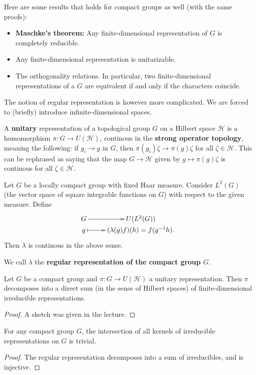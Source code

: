 \documentclass[11pt, english]{article}
\begin{document}
Here are some results that holds for compact groups as well (with the same proofs):
\begin{itemize}
\item \textbf{Maschke's theorem:} Any finite-dimensional representation of $G$ is completely reducible.
\item Any finite-dimensional representation is unitarizable.
\item The orthogonality relations. In particular, two finite-dimensional representations of a $G$ are equivalent if and only if the characters coincide. 
\end{itemize}

The notion of regular representation is however more complicated. We are forced to (briefly) introduce infinite-dimensional spaces.

A \textbf{unitary} representation of a topological group $G$ on a Hilbert space $\mathcal H$ is a homomorphism $\pi:G \to U(\mathcal H)$, continous in the \textbf{strong operator topology}, meaning the following: if $g_i \to g$ in $G$, then $\pi(g_i) \zeta \to \pi(g)\zeta$ for all $\zeta \in \mathcal H$. This can be rephrased as saying that the map $G \to \mathcal H$ given by $g \mapsto \pi(g) \zeta $ is continous for all $\zeta \in \mathcal H$.

\begin{example}
 Let $G$ be a locally compact group with fixed Haar measure. Consider $L^2(G)$ (the vector space of square integrable functions on $G$) with respect to the given measure. Define
$$
\xymatrix @ R = 0mm{
G \ar[r] &U(L^2(G)) \\
g \ar@{|->}[r] & (\lambda(g)f)(h) = f(g^{-1}h).
}
$$
Then $\lambda$ is continous in the above sense.

We call $\lambda$ the \textbf{regular representation of the compact group $G$}.
\end{example}

\begin{thm}
\label{thmpeterweyl}
Let $G$ be a compact group and $\pi:G \to U(\mathcal H)$ a unitary representation. Then $\pi$ decomposes into a direct sum (in the sense of Hilbert spaces) of finite-dimensional irreducible representations.
  
\end{thm}

\begin{proof}
A sketch was given in the lecture.
\end{proof}

\begin{corr}
For any compact group $G$, the intersection of all kernels of irreducible representations on $G$ is trivial.
\end{corr}
\begin{proof}
The regular representation decomposes into a sum of irreducibles, and is injective. 
\end{proof}
\end{document}
